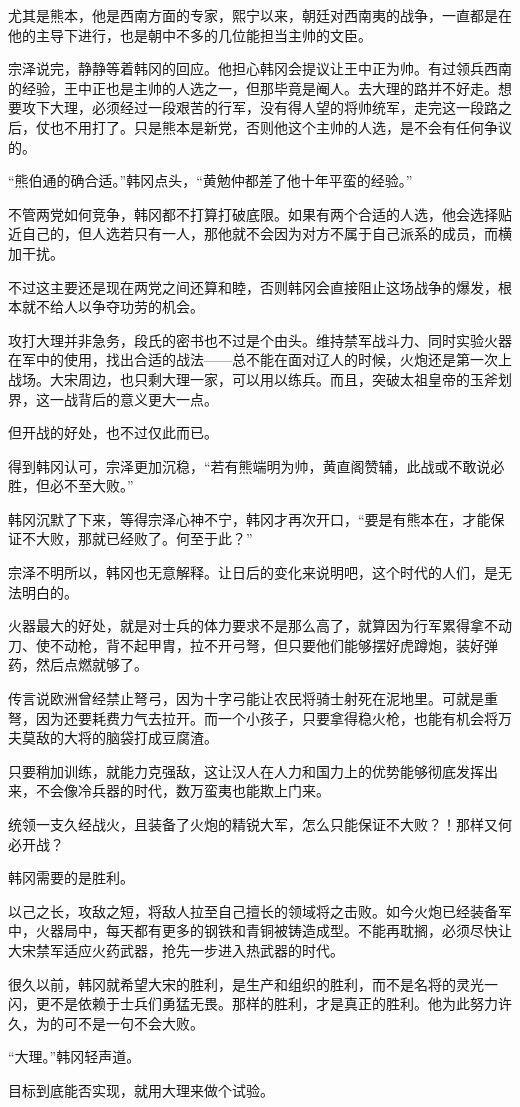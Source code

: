 尤其是熊本，他是西南方面的专家，熙宁以来，朝廷对西南夷的战争，一直都是在他的主导下进行，也是朝中不多的几位能担当主帅的文臣。

宗泽说完，静静等着韩冈的回应。他担心韩冈会提议让王中正为帅。有过领兵西南的经验，王中正也是主帅的人选之一，但那毕竟是阉人。去大理的路并不好走。想要攻下大理，必须经过一段艰苦的行军，没有得人望的将帅统军，走完这一段路之后，仗也不用打了。只是熊本是新党，否则他这个主帅的人选，是不会有任何争议的。

“熊伯通的确合适。”韩冈点头，“黄勉仲都差了他十年平蛮的经验。”

不管两党如何竞争，韩冈都不打算打破底限。如果有两个合适的人选，他会选择贴近自己的，但人选若只有一人，那他就不会因为对方不属于自己派系的成员，而横加干扰。

不过这主要还是现在两党之间还算和睦，否则韩冈会直接阻止这场战争的爆发，根本就不给人以争夺功劳的机会。

攻打大理并非急务，段氏的密书也不过是个由头。维持禁军战斗力、同时实验火器在军中的使用，找出合适的战法——总不能在面对辽人的时候，火炮还是第一次上战场。大宋周边，也只剩大理一家，可以用以练兵。而且，突破太祖皇帝的玉斧划界，这一战背后的意义更大一点。

但开战的好处，也不过仅此而已。

得到韩冈认可，宗泽更加沉稳，“若有熊端明为帅，黄直阁赞辅，此战或不敢说必胜，但必不至大败。”

韩冈沉默了下来，等得宗泽心神不宁，韩冈才再次开口，“要是有熊本在，才能保证不大败，那就已经败了。何至于此？”

宗泽不明所以，韩冈也无意解释。让日后的变化来说明吧，这个时代的人们，是无法明白的。

火器最大的好处，就是对士兵的体力要求不是那么高了，就算因为行军累得拿不动刀、使不动枪，背不起甲胄，拉不开弓弩，但只要他们能够摆好虎蹲炮，装好弹药，然后点燃就够了。

传言说欧洲曾经禁止弩弓，因为十字弓能让农民将骑士射死在泥地里。可就是重弩，因为还要耗费力气去拉开。而一个小孩子，只要拿得稳火枪，也能有机会将万夫莫敌的大将的脑袋打成豆腐渣。

只要稍加训练，就能力克强敌，这让汉人在人力和国力上的优势能够彻底发挥出来，不会像冷兵器的时代，数万蛮夷也能欺上门来。

统领一支久经战火，且装备了火炮的精锐大军，怎么只能保证不大败？！那样又何必开战？

韩冈需要的是胜利。

以己之长，攻敌之短，将敌人拉至自己擅长的领域将之击败。如今火炮已经装备军中，火器局中，每天都有更多的钢铁和青铜被铸造成型。不能再耽搁，必须尽快让大宋禁军适应火药武器，抢先一步进入热武器的时代。

很久以前，韩冈就希望大宋的胜利，是生产和组织的胜利，而不是名将的灵光一闪，更不是依赖于士兵们勇猛无畏。那样的胜利，才是真正的胜利。他为此努力许久，为的可不是一句不会大败。

“大理。”韩冈轻声道。

目标到底能否实现，就用大理来做个试验。

